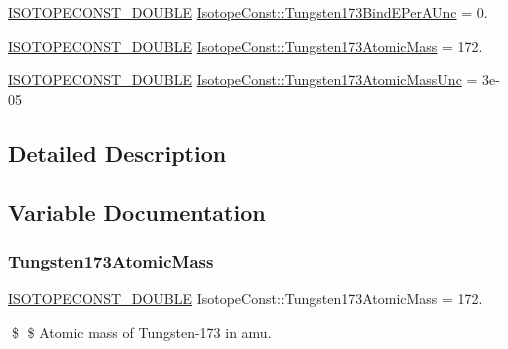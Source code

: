 \begin{DoxyCompactItemize}
\mbox{\hyperlink{group___isotope_const-_macros_ga8f45a7272ce02c0b4c65c44636ed719a}{I\+S\+O\+T\+O\+P\+E\+C\+O\+N\+S\+T\+\_\+\+D\+O\+U\+B\+LE}} \mbox{\hyperlink{group___isotope_const-_tungsten-_w173_ga14e1ac9433b2c2f12731c9820aff8e25}{Isotope\+Const\+::\+Tungsten173\+Bind\+E\+Per\+A\+Unc}} = 0.
\item 
\mbox{\hyperlink{group___isotope_const-_macros_ga8f45a7272ce02c0b4c65c44636ed719a}{I\+S\+O\+T\+O\+P\+E\+C\+O\+N\+S\+T\+\_\+\+D\+O\+U\+B\+LE}} \mbox{\hyperlink{group___isotope_const-_tungsten-_w173_gaf07fb932fd5939b252116af9c2dbe4a2}{Isotope\+Const\+::\+Tungsten173\+Atomic\+Mass}} = 172.
\item 
\mbox{\hyperlink{group___isotope_const-_macros_ga8f45a7272ce02c0b4c65c44636ed719a}{I\+S\+O\+T\+O\+P\+E\+C\+O\+N\+S\+T\+\_\+\+D\+O\+U\+B\+LE}} \mbox{\hyperlink{group___isotope_const-_tungsten-_w173_gaf5610cd8b01ea99be3407093b1f1f644}{Isotope\+Const\+::\+Tungsten173\+Atomic\+Mass\+Unc}} = 3e-\/05
\end{DoxyCompactItemize}


\subsection{Detailed Description}


\subsection{Variable Documentation}
\mbox{\label{group___isotope_const-_tungsten-_w173_gaf07fb932fd5939b252116af9c2dbe4a2}} 
\subsubsection{\texorpdfstring{Tungsten173\+Atomic\+Mass}{Tungsten173AtomicMass}}
{\footnotesize\ttfamily \mbox{\hyperlink{group___isotope_const-_macros_ga8f45a7272ce02c0b4c65c44636ed719a}{I\+S\+O\+T\+O\+P\+E\+C\+O\+N\+S\+T\+\_\+\+D\+O\+U\+B\+LE}} Isotope\+Const\+::\+Tungsten173\+Atomic\+Mass = 172.}

\$ \$ Atomic mass of Tungsten-\/173 in amu. \mbox{\label{group___isotope_const-_tungsten-_w173_gaf5610cd8b01ea99be3407093b1f1f644}} 
